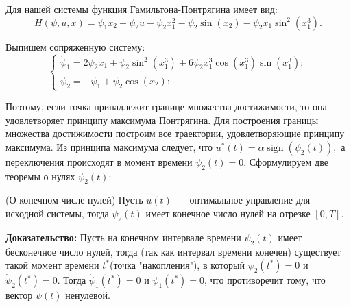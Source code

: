 \documentclass{article}
\theoremstyle{definition}
\DeclareMathOperator{\sign}{sign}
\begin{document}
	{Для нашей системы функция Гамильтона-Понтрягина имеет вид:}
	\begin{equation}
		H(\psi, u , x) = \psi_1x_2 + \psi_2u - \psi_2x_1^2 - \psi_2\sin(x_2) - \psi_2x_1\sin^2(x_1^3).
	\end{equation}
	
	{Выпишем сопряженную систему:}
	\begin{equation}
		\begin{cases}
	\dot \psi_1 = 2\psi_2x_1 + \psi_2\sin^2(x_1^3) + 6\psi_2x_1^3\cos(x_1^3)\sin(x_1^3);\\
	\dot \psi_2 = -\psi_1 + \psi_2\cos(x_2);
	\end{cases}
	\end{equation}
 	
 	{Поэтому, если точка принадлежит границе множества достижимости, то она удовлетворяет принципу максимума Понтрягина. Для построения границы множества достижимости построим все траектории, удовлетворяющие принципу максимума. }
 	\newpage
 	{Из принципа максимума следует, что $u^*(t) = \alpha\sign(\psi_2(t)),$ а переключения происходят в момент времени $\psi_2(t) = 0.$}
 	\newline
 	{Сформулируем две теоремы о нулях $\psi_2(t):$}
 	\begin{theorem}
 		{(О конечном числе нулей) Пусть $u(t)$~--- оптимальное управление для исходной системы, тогда $\psi_2(t)$ имеет конечное число нулей на отрезке $[0, T].$}
 		
    \end{theorem}	
 		{\textbf{Доказательство:} Пусть на  конечном интервале времени $\psi_2(t)$ имеет бесконечное число нулей, тогда (так как интервал времени конечен) существует такой момент времени $t^*$(точка "накопления"), в который $\psi_2(t^*) = 0$ и $\dot \psi_2(t^*) = 0.$ Тогда $\dot \psi_1(t^*) = 0$ и $\psi_1(t^*) = 0$, что противоречит тому, что вектор $\psi(t)$ ненулевой.} 
 	
\end{document}
